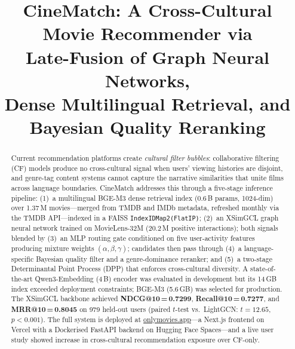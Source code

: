 \documentclass[conference]{IEEEtran}
\begin{document}
\title{CineMatch: A Cross-Cultural Movie Recommender via\\
Late-Fusion of Graph Neural Networks,\\Dense Multilingual Retrieval,
and Bayesian Quality Reranking}

\author{
  \and
}
\maketitle

\begin{abstract}
Current recommendation platforms create \emph{cultural filter bubbles}:
collaborative filtering (CF) models produce no cross-cultural signal when
users' viewing histories are disjoint, and genre-tag content systems cannot
capture the narrative similarities that unite films across language boundaries.
CineMatch addresses this through a five-stage inference pipeline:
(1)~a multilingual BGE-M3 dense retrieval index (0.6\,B params, 1024-dim)
over 1.37\,M movies---merged from TMDB and IMDb metadata, refreshed
monthly via the TMDB API---indexed in a FAISS \texttt{IndexIDMap2(FlatIP)};
(2)~an XSimGCL graph neural network trained on MovieLens-32M (20.2\,M
positive interactions); both signals blended by (3)~an MLP routing gate
conditioned on five user-activity features producing mixture weights
$(\alpha,\beta,\gamma)$; candidates then pass through (4)~a
language-specific Bayesian quality filter and a genre-dominance reranker;
and (5)~a two-stage Determinantal Point Process (DPP) that enforces
cross-cultural diversity.
A state-of-the-art Qwen3-Embedding (4\,B) encoder was evaluated in
development but its 14\,GB index exceeded deployment constraints; BGE-M3
(5.6\,GB) was selected for production.
The XSimGCL backbone achieved \textbf{NDCG@10\,=\,0.7299},
\textbf{Recall@10\,=\,0.7277}, and \textbf{MRR@10\,=\,0.8045} on
979 held-out users (paired $t$-test vs.\ LightGCN: $t\!=\!12.65$,
$p\!<\!0.001$).
The full system is deployed at \url{onlymovies.app}---a Next.js frontend
on Vercel with a Dockerised FastAPI backend on Hugging Face Spaces---and
a live user study showed increase in
cross-cultural recommendation exposure over CF-only.
\end{abstract}
\end{document}
